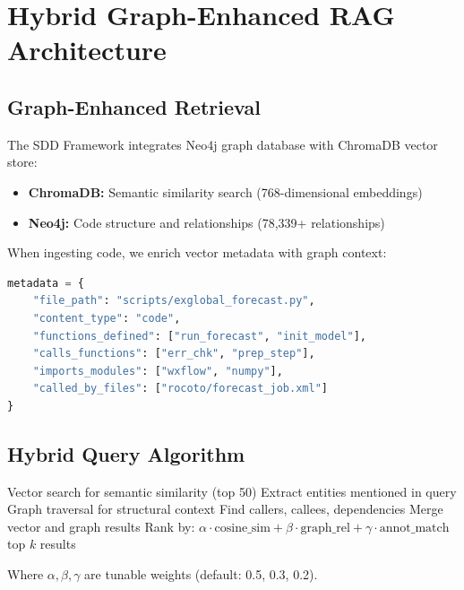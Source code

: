 \documentclass[11pt,letterpaper]{article}
\begin{document}
\section{Hybrid Graph-Enhanced RAG Architecture}
\label{sec:rag}

\subsection{Graph-Enhanced Retrieval}

The SDD Framework integrates Neo4j graph database with ChromaDB vector store:

\begin{itemize}
    \item \textbf{ChromaDB:} Semantic similarity search (768-dimensional embeddings)
    \item \textbf{Neo4j:} Code structure and relationships (78,339+ relationships)
\end{itemize}

When ingesting code, we enrich vector metadata with graph context:

\begin{lstlisting}[language=Python,caption={Graph-Enriched Metadata}]
metadata = {
    "file_path": "scripts/exglobal_forecast.py",
    "content_type": "code",
    "functions_defined": ["run_forecast", "init_model"],
    "calls_functions": ["err_chk", "prep_step"],
    "imports_modules": ["wxflow", "numpy"],
    "called_by_files": ["rocoto/forecast_job.xml"]
}
\end{lstlisting}

\subsection{Hybrid Query Algorithm}

\begin{algorithm}
\caption{Hybrid RAG Query}
\begin{algorithmic}[1]
\STATE Vector search for semantic similarity (top 50)
\STATE Extract entities mentioned in query
    \STATE Graph traversal for structural context
    \STATE Find callers, callees, dependencies
\ENDFOR
\STATE Merge vector and graph results
\STATE Rank by: $\alpha \cdot \text{cosine\_sim} + \beta \cdot \text{graph\_rel} + \gamma \cdot \text{annot\_match}$
\RETURN top $k$ results
\end{algorithmic}
\end{algorithm}

Where $\alpha, \beta, \gamma$ are tunable weights (default: 0.5, 0.3, 0.2).
\end{document}
